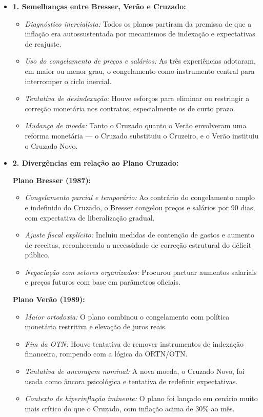 \documentclass[a4paper,12pt]{article}[abntex2]
\begin{document}
\begin{itemize}
    \item \textbf{1. Semelhanças entre Bresser, Verão e Cruzado:}
    \begin{itemize}
        \item \textit{Diagnóstico inercialista:} Todos os planos partiram da premissa de que a inflação era autossustentada por mecanismos de indexação e expectativas de reajuste.
        \item \textit{Uso do congelamento de preços e salários:} As três experiências adotaram, em maior ou menor grau, o congelamento como instrumento central para interromper o ciclo inercial.
        \item \textit{Tentativa de desindexação:} Houve esforços para eliminar ou restringir a correção monetária nos contratos, especialmente os de curto prazo.
        \item \textit{Mudança de moeda:} Tanto o Cruzado quanto o Verão envolveram uma reforma monetária — o Cruzado substituiu o Cruzeiro, e o Verão instituiu o Cruzado Novo.
    \end{itemize}

    \item \textbf{2. Divergências em relação ao Plano Cruzado:}

    \textbf{Plano Bresser (1987):}
    \begin{itemize}
        \item \textit{Congelamento parcial e temporário:} Ao contrário do congelamento amplo e indefinido do Cruzado, o Bresser congelou preços e salários por 90 dias, com expectativa de liberalização gradual.
        \item \textit{Ajuste fiscal explícito:} Incluiu medidas de contenção de gastos e aumento de receitas, reconhecendo a necessidade de correção estrutural do déficit público.
        \item \textit{Negociação com setores organizados:} Procurou pactuar aumentos salariais e preços futuros com base em parâmetros oficiais.
    \end{itemize}

    \textbf{Plano Verão (1989):}
    \begin{itemize}
        \item \textit{Maior ortodoxia:} O plano combinou o congelamento com política monetária restritiva e elevação de juros reais.
        \item \textit{Fim da OTN:} Houve tentativa de remover instrumentos de indexação financeira, rompendo com a lógica da ORTN/OTN.
        \item \textit{Tentativa de ancoragem nominal:} A nova moeda, o Cruzado Novo, foi usada como âncora psicológica e tentativa de redefinir expectativas.
        \item \textit{Contexto de hiperinflação iminente:} O plano foi lançado em cenário muito mais crítico do que o Cruzado, com inflação acima de 30\% ao mês.
    \end{itemize}


\end{itemize}
\end{document}
